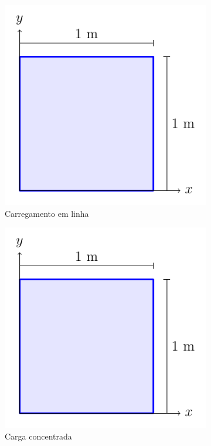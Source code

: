 \begin{figure}
    \centering
    \caption{Condições de contorno para os casos bidimensionais.}
    \begin{subfigure}[b]{0.45\textwidth}
        \centering
        \includegraphics[page=3]{Figuras/verificacao_quadrado.pdf}
        \caption{Carregamento em linha}
        \label{fig:verificacao_quadrado_3}
    \end{subfigure}
    \begin{subfigure}[b]{0.45\textwidth}
        \centering
        \includegraphics[page=4]{Figuras/verificacao_quadrado.pdf}
        \caption{Carga concentrada}
        \label{fig:verificacao_quadrado_4}
    \end{subfigure}
    \begin{subfigure}[b]{0.45\textwidth}
        \centering

\end{subfigure}
\end{figure}
